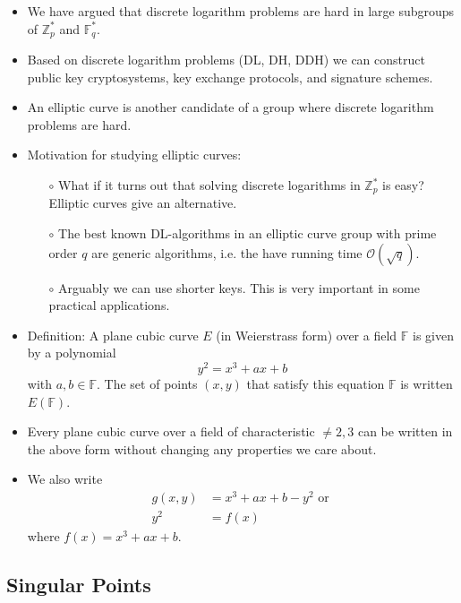 \documentclass[a4paper]{scrartcl}
\begin{document}
\begin{itemize}
\item We have argued that discrete logarithm problems are hard in large subgroups of $\mathbb{Z}_p^*$ and $\mathbb{F}_q^*$.
\item Based on discrete logarithm problems (DL, DH, DDH) we can construct public key cryptosystems, key exchange protocols, and signature schemes.
\item An elliptic curve is another candidate of a group where discrete logarithm problems are hard. 
\item Motivation for studying elliptic curves:
\begin{itemize}
\item [$\circ$] What if it turns out that solving discrete logarithms in $\mathbb{Z}_p^*$ is easy? Elliptic curves give an alternative.
\item [$\circ$] The best known DL-algorithms in an elliptic curve group with prime order $q$ are generic algorithms, i.e. the have running time $\mathcal{O}(\sqrt{q})$.
\item [$\circ$] Arguably we can use shorter keys. This is very important in some practical applications. 
\end{itemize}
\item Definition: A plane cubic curve $E$ (in Weierstrass form) over a field $\mathbb{F}$ is given by a polynomial $$y^2 = x^3 + ax + b$$ with $a,b \in \mathbb{F}$. The set of points $(x,y)$ that satisfy this equation $\mathbb{F}$ is written $E(\mathbb{F})$.
\item Every plane cubic curve over a field of characteristic $\neq 2,3$ can be written in the above form without changing any properties we care about.
\item We also write
\begin{align*}
g(x,y) &= x^3 + ax + b - y^2 \text{\ or \ } \\
y^2 &= f(x)
\end{align*}
where $f(x) = x^3 + ax + b$.
\end{itemize}

\subsection*{Singular Points}
\end{document}
